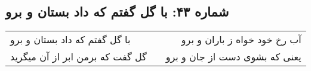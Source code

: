 \begin{center}
\section*{شماره ۴۳: با گل گفتم که داد بستان و برو}
\label{sec:043}
\begin{longtable}{l p{0.5cm} r}
با گل گفتم که داد بستان و برو
&&
آب رخ خود خواه ز باران و برو
\\
گل گفت که برمن ابر از آن میگرید
&&
یعنی که بشوی دست از جان و برو
\\
\end{longtable}
\end{center}
